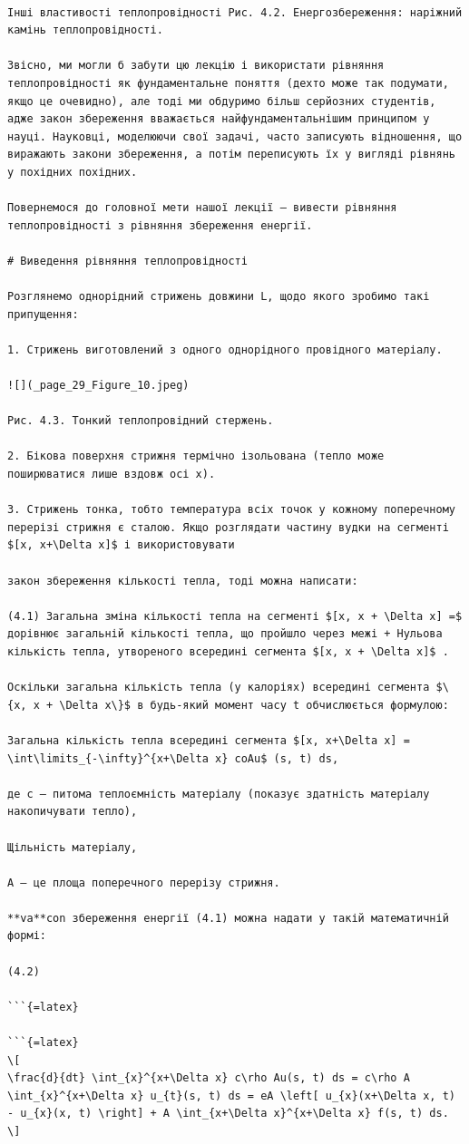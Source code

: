 \documentclass[
  ukrainian,
]{article}
\begin{document}
\begin{verbatim}

Інші властивості теплопровідності Рис. 4.2. Енергозбереження: наріжний камінь теплопровідності.

Звісно, ми могли б забути цю лекцію і використати рівняння теплопровідності як фундаментальне поняття (дехто може так подумати, якщо це очевидно), але тоді ми обдуримо більш серйозних студентів, адже закон збереження вважається найфундаментальнішим принципом у науці. Науковці, моделюючи свої задачі, часто записують відношення, що виражають закони збереження, а потім переписують їх у вигляді рівнянь у похідних похідних.

Повернемося до головної мети нашої лекції — вивести рівняння теплопровідності з рівняння збереження енергії.

# Виведення рівняння теплопровідності

Розглянемо однорідний стрижень довжини L, щодо якого зробимо такі припущення:

1. Стрижень виготовлений з одного однорідного провідного матеріалу.

![](_page_29_Figure_10.jpeg)

Рис. 4.3. Тонкий теплопровідний стержень.

2. Бікова поверхня стрижня термічно ізольована (тепло може поширюватися лише вздовж осі x).

3. Стрижень тонка, тобто температура всіх точок у кожному поперечному перерізі стрижня є сталою. Якщо розглядати частину вудки на сегменті $[x, x+\Delta x]$ і використовувати

закон збереження кількості тепла, тоді можна написати:

(4.1) Загальна зміна кількості тепла на сегменті $[x, x + \Delta x] =$ дорівнює загальній кількості тепла, що пройшло через межі + Нульова кількість тепла, утвореного всередині сегмента $[x, x + \Delta x]$ .

Оскільки загальна кількість тепла (у калоріях) всередині сегмента $\{x, x + \Delta x\}$ в будь-який момент часу t обчислюється формулою:

Загальна кількість тепла всередині сегмента $[x, x+\Delta x] = \int\limits_{-\infty}^{x+\Delta x} coAu$ (s, t) ds,

де c — питома теплоємність матеріалу (показує здатність матеріалу накопичувати тепло),

Щільність матеріалу,

A — це площа поперечного перерізу стрижня.

**va**con збереження енергії (4.1) можна надати у такій математичній формі:

(4.2)

```{=latex}

```{=latex}
\[
\frac{d}{dt} \int_{x}^{x+\Delta x} c\rho Au(s, t) ds = c\rho A \int_{x}^{x+\Delta x} u_{t}(s, t) ds = eA \left[ u_{x}(x+\Delta x, t) - u_{x}(x, t) \right] + A \int_{x+\Delta x}^{x+\Delta x} f(s, t) ds.
\]
\end{verbatim}
\end{document}

